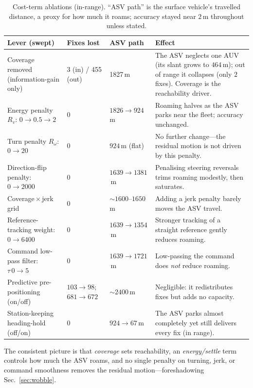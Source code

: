 \documentclass[12pt,a4paper,oneside]{book}
\newcommand{\secref}[1]{Sec.~\ref{#1}}
\begin{document}
\begin{table}[H]
\centering
\caption{Cost-term ablations (in-range). ``ASV path'' is the surface vehicle's travelled distance, a proxy
for how much it roams; accuracy stayed near $2$\,m throughout unless stated.}
\label{tab:ablation}
\begin{tabular}{@{}p{4.3cm}p{2.3cm}p{2.4cm}p{4.0cm}@{}}
\toprule
Lever (swept) & Fixes lost & ASV path & Effect \\
\midrule
Coverage removed (information-gain only) & 3 (in) / 455 (out) & 1827\,m &
The ASV neglects one AUV (its slant grows to $464$\,m); out of range it collapses (only $2$ fixes). Coverage
is the reachability driver. \\
Energy penalty $R_v$: $0\!\to\!0.5\!\to\!2$ & 0 & $1826\!\to\!924$\,m &
Roaming halves as the ASV parks near the fleet; accuracy unchanged. \\
Turn penalty $R_\omega$: $0\!\to\!20$ & 0 & $924$\,m (flat) &
No further change---the residual motion is not driven by this penalty. \\
Direction-flip penalty: $0\!\to\!2000$ & 0 & $1639\!\to\!1381$\,m &
Penalising steering reversals trims roaming modestly, then saturates. \\
Coverage\,$\times$\,jerk grid & 0 & $\sim1600$--$1650$\,m &
Adding a jerk penalty barely moves the ASV travel. \\
Reference-tracking weight: $0\!\to\!6400$ & 0 & $1639\!\to\!1354$\,m &
Stronger tracking of a straight reference gently reduces roaming. \\
Command low-pass filter: $\tau\,0\!\to\!5$ & 0 & $1639\!\to\!1721$\,m &
Low-passing the command does \emph{not} reduce roaming. \\
Predictive pre-positioning (on/off) & $103\!\to\!98$; $681\!\to\!672$ & $\sim2400$\,m &
Negligible: it redistributes fixes but adds no capacity. \\
Station-keeping heading-hold (off/on) & 0 & $924\!\to\!67$\,m &
The ASV parks almost completely yet still delivers every fix (in range). \\
\bottomrule
\end{tabular}
\end{table}

\noindent The consistent picture is that \emph{coverage} sets reachability, an \emph{energy/settle} term
controls how much the ASV roams, and no single penalty on turning, jerk, or command smoothness removes the
residual motion---foreshadowing \secref{sec:wobble}.
\end{document}
